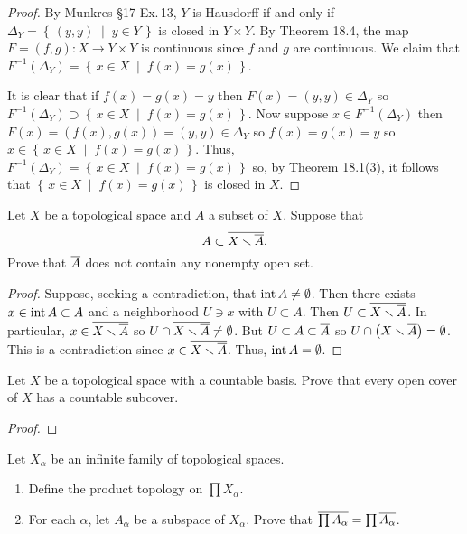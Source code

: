 \begin{proof}
By Munkres \S17 Ex.\,13, $Y$ is Hausdorff if and only if
$\Delta_Y=\left\{\,(y,y)\;\middle|\;y\in Y\,\right\}$ is closed in
$Y\times Y$. By Theorem 18.4, the map $F=(f,g)\colon X\to Y\times
Y$ is continuous since $f$ and $g$ are continuous. We claim that
$F^{-1}(\Delta_Y)=\left\{\,x\in
  X\;\middle|\;f(x)=g(x)\,\right\}$.

It is clear that if $f(x)=g(x)=y$ then $F(x)=(y,y)\in\Delta_Y$ so
$F^{-1}(\Delta_Y)\supset\left\{\,x\in
  X\;\middle|\;f(x)=g(x)\,\right\}$. Now suppose $x\in
F^{-1}(\Delta_Y)$ then $F(x)=(f(x),g(x))=(y,y)\in\Delta_Y$ so
$f(x)=g(x)=y$ so $x\in\left\{\,x\in
  X\;\middle|\;f(x)=g(x)\,\right\}$. Thus, $F^{-1}(\Delta_Y)=\left\{\,x\in
  X\;\middle|\;f(x)=g(x)\,\right\}$ so, by Theorem 18.1(3), it
follows that $\left\{\,x\in X\;\middle|\;f(x)=g(x)\,\right\}$ is
closed in $X$.
\end{proof}
\begin{problem}
Let $X$ be a topological space and $A$ a subset of $X$. Suppose that
\[
A\subset\overline{X\smallsetminus\overline{A}}.
\]
Prove that $\overline{A}$ does not contain any nonempty open set.
\end{problem}
\begin{proof}
Suppose, seeking a contradiction, that $\operatorname{int} A\neq\emptyset$. Then there
exists $x\in\operatorname{int} A\subset A$ and a neighborhood $U\ni x$ with
$U\subset A$. Then $U\subset\overline{X\smallsetminus\overline{A}}$. In
particular, $x\in\overline{X\smallsetminus\overline{A}}$ so
$U\cap\overline{X\smallsetminus\overline{A}}\neq\emptyset$. But $U\subset
A\subset\overline{A}$ so $U\cap \bigl(X\smallsetminus\overline{A}\bigr)=\emptyset$. This is a contradiction since
$x\in\overline{X\smallsetminus\overline{A}}$. Thus, $\operatorname{int} A=\emptyset$.
\end{proof}
\begin{problem}
Let $X$ be a topological space with a countable basis. Prove that
every open cover of $X$ has a countable subcover.
\end{problem}
\begin{proof}
\end{proof}
\begin{problem}
Let $X_\alpha$ be an infinite family of topological spaces.
\begin{enumerate}[noitemsep,label=(\alph*)]
\item Define the product topology on $\prod X_\alpha$.
\item For each $\alpha$, let $A_\alpha$ be a subspace of
  $X_\alpha$. Prove that $\overline{\prod
    A_\alpha}=\prod\overline{A_\alpha}$.
\end{enumerate}
\end{problem}
